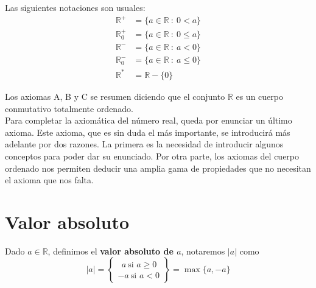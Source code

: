 \vspace{0.5cm}
Las siguientes notaciones son usuales:
\begin{equation*}\begin{split}
    \mathbb{R}^{+}&=\{a \in \mathbb{R}~:~0 < a\}\\
    \mathbb{R}_0^{+}&=\{a \in \mathbb{R}~:~0 \leq a\} \\
    \mathbb{R}^{-}&=\{a \in \mathbb{R}~:~a < 0\} \\
    \mathbb{R}_0^{-}&=\{a \in \mathbb{R}~:~a \leq 0\} \\
    \mathbb{R}^{*}&=\mathbb{R}-\{0\}
\end{split}\end{equation*}

Los axiomas A, B y C se resumen diciendo que el conjunto $\mathbb{R}$ es un cuerpo conmutativo totalmente ordenado.\\

Para completar la axiomática del número real, queda por enunciar un último axioma. Este axioma, que es sin duda el
más importante, se introducirá más adelante por dos razones. La primera es la necesidad de introducir algunos conceptos
para poder dar su enunciado. Por otra parte, los axiomas del cuerpo ordenado nos permiten deducir una
amplia gama de propiedades que no necesitan el axioma que nos falta.


\section{Valor absoluto}
\begin{definicion}
Dado $a \in \mathbb{R}$, definimos el \textbf{valor absoluto de $a$}, notaremos $|a|$ como
\begin{equation*}
    |a| =
    \left\{ \begin{array}{lcc}
        ~~a ~\text{si $a \geq 0$} \\
        -a ~\text{si $a < 0$}
        \end{array}
    \right\} = \max \{a, -a\}
\end{equation*}
\end{definicion}


